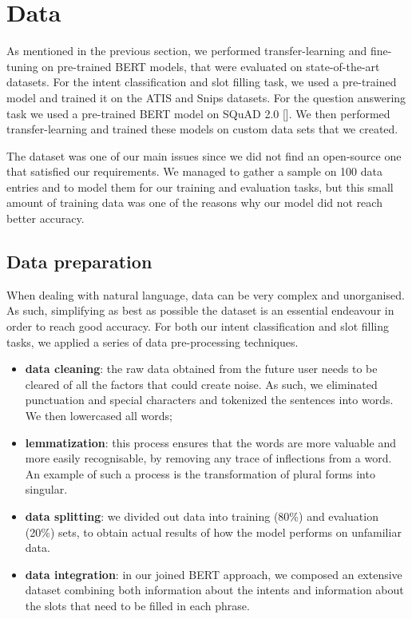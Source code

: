 \documentclass[runningheads,a4paper,11pt]{report}
\begin{document}
\section{Data}
\label{section:data}

As mentioned in the previous section, we performed transfer-learning and fine-tuning on pre-trained BERT models, that were evaluated on state-of-the-art datasets. For the intent classification and slot filling task, we used a pre-trained model and trained it on the ATIS \cite{gok10} and Snips \cite{ali16} datasets. For the question answering task we used a pre-trained BERT model on SQuAD 2.0 []. We then performed transfer-learning and trained these models on custom data sets that we created.

The dataset was one of our main issues since we did not find an open-source one that satisfied our requirements. We managed to gather a sample on 100 data entries and to model them for our training and evaluation tasks, but this small amount of training data was one of the reasons why our model did not reach better accuracy.

\subsection{Data preparation}
\label{section:dataprep}

When dealing with natural language, data can be very complex and unorganised. As such, simplifying as best as possible the dataset is an essential endeavour in order to reach good accuracy. For both our intent classification and slot filling tasks, we applied a series of data pre-processing techniques.


\begin{itemize}
	\item \textbf{data cleaning}: the raw data obtained from the future user needs to be cleared of all the factors that could create noise. As such, we eliminated punctuation and special characters and tokenized the sentences into words. We then lowercased all words;
	\item \textbf{lemmatization}: this process ensures that the words are more valuable and more easily recognisable, by removing any trace of inflections from a word. An example of such a process is the transformation of plural forms into singular.
	\item \textbf{data splitting}: we divided out data into training (80\%) and evaluation (20\%) sets, to obtain actual results of how the model performs on unfamiliar data.
	\item \textbf{data integration}: in our joined BERT approach, we composed an extensive dataset combining both information about the intents and information about the slots that need to be filled in each phrase.
\end{itemize}
 
\end{document}
